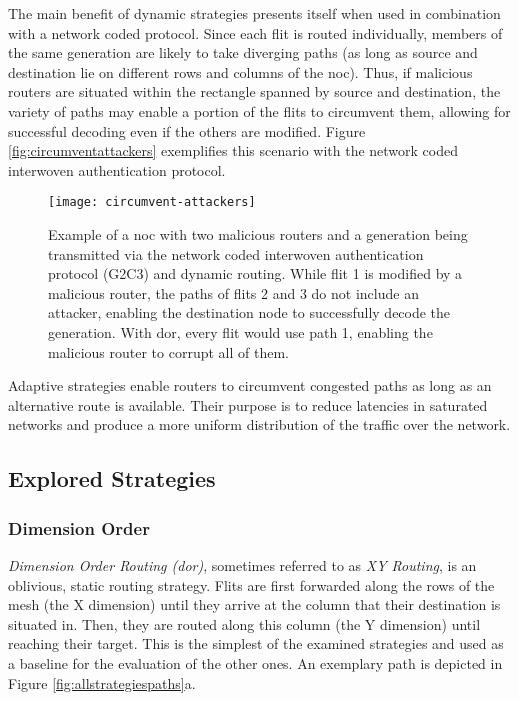 The main benefit of dynamic strategies presents itself when used in combination with a network coded protocol. Since each flit is routed individually,
members of the same generation are likely to take diverging paths (as long as source and destination lie on different rows and columns of the
\gls{noc}). Thus, if malicious routers are situated within the rectangle spanned by source and destination, the variety of paths may enable a portion
of the flits to circumvent them, allowing for successful decoding even if the others are modified. Figure \vref{fig:circumventattackers} exemplifies
this scenario with the network coded interwoven authentication protocol.

\begin{figure}
    \centering
    \texttt{[image: circumvent-attackers]}
    \caption[Example of dodging malicious routers with dynamic routing]{Example of a \gls{noc} with two malicious routers and a generation being
    transmitted via the network coded interwoven authentication protocol (G2C3) and dynamic routing. While flit 1 is modified by a malicious router,
    the paths of flits 2 and 3 do not include an attacker, enabling the destination node to successfully decode the generation. With \gls{dor}, every
    flit would use path 1, enabling the malicious router to corrupt all of them.}
    \label{fig:circumventattackers}
\end{figure}

Adaptive strategies enable routers to circumvent congested paths as long as an alternative route is available. Their purpose is to reduce latencies in
saturated networks and produce a more uniform distribution of the traffic over the network.

\subsection{Explored Strategies}\label{subsec:routingstrategies}
\subsubsection{Dimension Order}\label{subsubsec:dor}
\textit{Dimension Order Routing (\gls{dor})}, sometimes referred to as \textit{XY Routing}, is an oblivious, static routing strategy. Flits are first
forwarded along the rows of the mesh (the X dimension) until they arrive at the column that their destination is situated in. Then, they are routed
along this column (the Y dimension) until reaching their target. This is the simplest of the examined strategies and used as a baseline for the
evaluation of the other ones. An exemplary path is depicted in Figure \ref{fig:allstrategiespaths}a.

